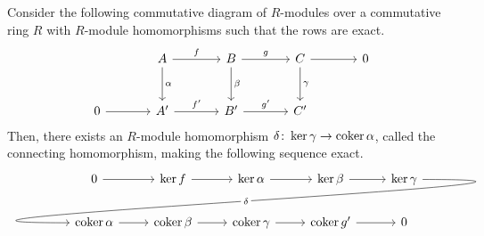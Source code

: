 \documentclass[a4paper,12pt]{article}
\begin{document}
\begin{lemma}\label{lem:snake_lemma}
    Consider the following commutative diagram of $R$-modules over a commutative ring $R$ with $R$-module homomorphisms such that the rows are exact.
    \[\begin{tikzcd}[sep=large]
	& A & B & C & 0 \\
	0 & {A'} & {B'} & {C'}
	\arrow["f", from=1-2, to=1-3]
	\arrow["\alpha", from=1-2, to=2-2]
	\arrow["g", from=1-3, to=1-4]
	\arrow["\beta", from=1-3, to=2-3]
	\arrow[from=1-4, to=1-5]
	\arrow["\gamma", from=1-4, to=2-4]
	\arrow[from=2-1, to=2-2]
	\arrow["{f'}", from=2-2, to=2-3]
	\arrow["{g'}", from=2-3, to=2-4]
    \end{tikzcd}\]
    Then, there exists an $R$-module homomorphism $\delta \colon \ker \gamma \to \operatorname{coker} \alpha$, called the connecting homomorphism, making the following sequence exact.
    \[\begin{tikzcd}
        & 0 \ar[r] & \ker f \ar[r] & \ker \alpha \ar[r] & \ker \beta \ar[r] & \ker \gamma \arrow[out=0, in=180, looseness=2, overlay, lllld, "\delta"{description}]\\
        & \coker \alpha \ar[r] & \coker \beta \ar[r] & \coker \gamma \ar[r] & \coker g' \ar[r] & 0
    \end{tikzcd}\]
\end{lemma}
\end{document}

